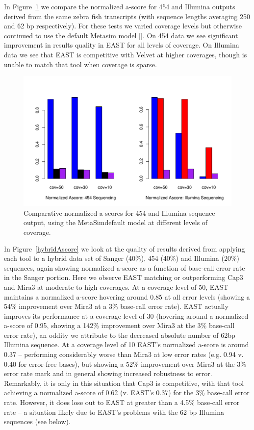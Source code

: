 \documentclass{bioinfo}
\newcommand{\capthree} {{\small Cap3}}
\newcommand{\metasim} {{\small MetaSim}}
\newcommand{\east} {{\small EAST}}
\newcommand{\velvet}{{\small Velvet}}
\newcommand{\mira}{{\small Mira3}}
\begin{document}
 In
Figure~\ref{nextgenAscore} we compare the normalized a-score for 454
and Illumina outputs derived from the same zebra fish transcripts
(with sequence lengths averaging 250 and 62 bp respectively).  For
these tests we varied coverage levels but otherwise continued to use
the default Metasim model [\cite{Richter08}].  On 454 data we see
significant improvement in results quality in \east\/ for all levels
of coverage.  On Illumina data we see that \east\/ is competitive with
\velvet\/ at higher coverages, though is unable to match that tool
when coverage is sparse.

\begin{figure}[htb]
\centerline{\includegraphics[width=5in]{pics.d/ascore_nxtgen.pdf}}
\caption{Comparative normalized a-scores for 454 and Illumina sequence
  output, using the \metasim default model at different levels
  of coverage.}
\label{nextgenAscore}
\end{figure}

 In Figure~\ref{hybridAscore} we look at the
quality of results derived from applying each tool to a hybrid data
set of Sanger (40\%), 454 (40\%) and Illumina (20\%) sequences, again
showing normalized a-score as a function of base-call error rate in
the Sanger portion.  Here we observe \east\/ matching or outperforming
\capthree\/ and \mira\/ at moderate to high coverages.  At a coverage
level of 50, \east\/ maintains a normalized a-score hovering around
0.85 at all error levels (showing a 54\% improvement over \mira\/ at a
3\% base-call error rate).  \east\/ actually improves its performance
at a coverage level of 30 (hovering around a normalized a-score of
0.95, showing a 142\% improvement over \mira\/ at the 3\% base-call
error rate), an oddity we attribute to the decreased absolute number
of 62bp Illumina sequence.  At a coverage level of 10 \east's
normalized a-score is around 0.37 -- performing considerably worse
than \mira\/ at low error rates (e.g. 0.94 v. 0.40 for error-free
bases), but showing a 52\% improvement over \mira\/ at the 3\% error
rate mark and in general showing increased robustness to error.
Remarkably, it is only in this situation that \capthree\/ is
competitive, with that tool achieving a normalized a-score of 0.62
(v. \east's 0.37) for the 3\% base-call error rate.  However, it does
lose out to \east\/ at greater than a 4.5\% base-call error rate -- a
situation likely due to \east's problems with the 62 bp Illumina
sequences (see below).
\end{document}
